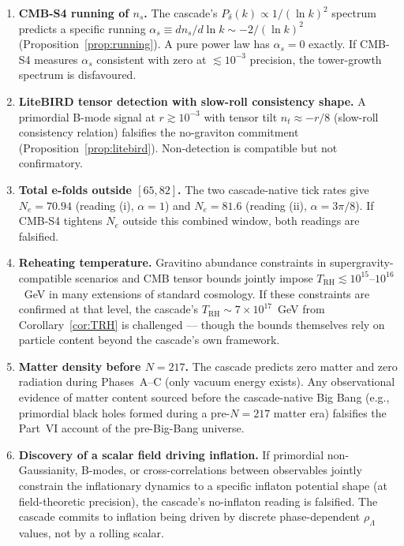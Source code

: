 \documentclass[12pt,a4paper]{article}
\begin{document}
\begin{enumerate}[leftmargin=*,nosep]

\item \textbf{CMB-S4 running of $n_s$.} The cascade's $P_\delta(k) \propto
1/(\ln k)^2$ spectrum predicts a specific running $\alpha_s \equiv
d n_s / d\!\ln k \sim -2/(\ln k)^2$ (Proposition~\ref{prop:running}). A pure
power law has $\alpha_s = 0$ exactly. If CMB-S4 measures $\alpha_s$ consistent
with zero at $\lesssim 10^{-3}$ precision, the tower-growth spectrum is
disfavoured.

\item \textbf{LiteBIRD tensor detection with slow-roll consistency shape.} A
primordial B-mode signal at $r \gtrsim 10^{-3}$ with tensor tilt $n_t \approx
-r/8$ (slow-roll consistency relation) falsifies the no-graviton commitment
(Proposition~\ref{prop:litebird}). Non-detection is compatible but not
confirmatory.

\item \textbf{Total e-folds outside $[65, 82]$.} The two cascade-native tick
rates give $N_e = 70.94$ (reading (i), $\alpha = 1$) and $N_e = 81.6$
(reading (ii), $\alpha = 3\pi/8$). If CMB-S4 tightens $N_e$ outside this
combined window, both readings are falsified.

\item \textbf{Reheating temperature.} Gravitino abundance constraints in
supergravity-compatible scenarios and CMB tensor bounds jointly impose
$T_{\mathrm{RH}} \lesssim 10^{15}$--$10^{16}$~GeV in many extensions of
standard cosmology. If these constraints are confirmed at that level, the
cascade's $T_{\mathrm{RH}} \sim 7 \times 10^{17}$~GeV from
Corollary~\ref{cor:TRH} is challenged --- though the bounds themselves rely
on particle content beyond the cascade's own framework.

\item \textbf{Matter density before $N = 217$.} The cascade predicts zero
matter and zero radiation during Phases~A--C (only vacuum energy exists). Any
observational evidence of matter content sourced before the cascade-native
Big Bang (e.g., primordial black holes formed during a pre-$N=217$ matter
era) falsifies the Part~VI account of the pre-Big-Bang universe.

\item \textbf{Discovery of a scalar field driving inflation.} If primordial
non-Gaussianity, B-modes, or cross-correlations between observables jointly
constrain the inflationary dynamics to a specific inflaton potential shape
(at field-theoretic precision), the cascade's no-inflaton reading is
falsified. The cascade commits to inflation being driven by discrete
phase-dependent $\rho_\Lambda$ values, not by a rolling scalar.


\end{enumerate}
\end{document}
